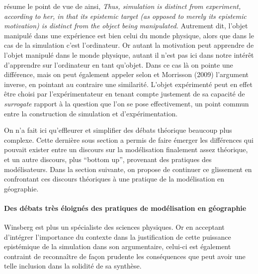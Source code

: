 \textcite{Winsberg2013} résume le point de vue de \autocite{Peschard2010} ainsi, \textit{Thus, simulation is distinct from experiment, according to her, in that its epistemic target (as opposed to merely its epistemic motivation) is distinct from the object being manipulated.} Autrement dit, l'objet manipulé dans une expérience est bien celui du monde physique, alors que dans le cas de la simulation c'est l'ordinateur. Or autant la motivation peut apprendre de l'objet manipulé dans le monde physique, autant il n'est pas ici dans notre intérêt d'apprendre sur l'ordinateur en tant qu'objet. Dans ce cas là on pointe une différence, mais on peut également appeler selon \textcite{Winsberg2013} et Morrisson (2009) l'argument inverse, en pointant au contraire une similarité. L'objet expérimenté peut en effet être choisi par l'expérimentateur en tenant compte justement de sa capacité de \textit{surrogate} rapport à la question que l'on se pose effectivement, un point commun entre la construction de simulation et d'expérimentation.

On n'a fait ici qu'effleurer et simplifier des débats théorique beaucoup plus complexe. Cette dernière sous section a permis de faire émerger les différences qui pouvait exister entre un discours sur la modélisation finalement assez théorique, et un autre discours, plus \foreignquote{english}{bottom up}, provenant des pratiques des modélisateurs. Dans la section suivante, on propose de continuer ce glissement en confrontant ces discours théoriques à une pratique de la modélisation en géographie.

\paragraph{Des débats très éloignés des pratiques de modélisation en géographie}

Winsberg est plus un spécialiste des sciences physiques. Or en acceptant d'intégrer l'importance du contexte dans la justification de cette puissance epistémique de la simulation dans son argumentaire, celui-ci est également contraint de reconnaître de façon prudente les conséquences que peut avoir une telle inclusion dans la solidité de sa synthèse.

